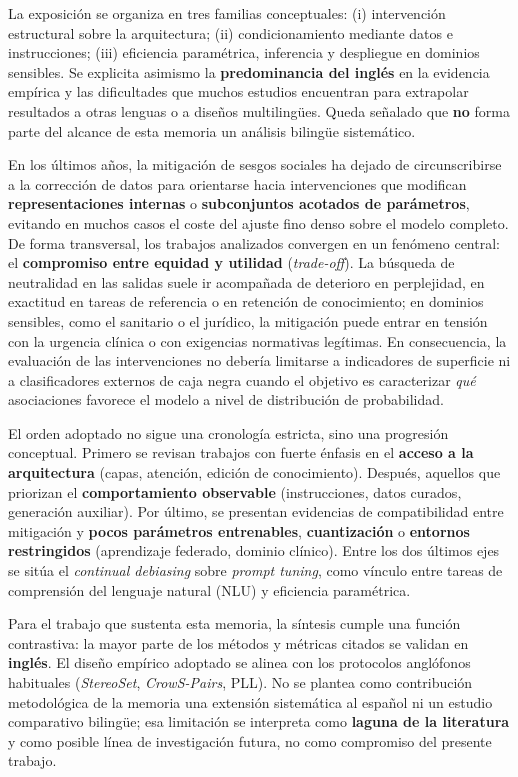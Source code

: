 \documentclass[12pt,a4paper]{report}
\begin{document}
La exposición se organiza en tres familias conceptuales: (i) intervención estructural sobre la arquitectura; (ii) condicionamiento mediante datos e instrucciones; (iii) eficiencia paramétrica, inferencia y despliegue en dominios sensibles. Se explicita asimismo la \textbf{predominancia del inglés} en la evidencia empírica y las dificultades que muchos estudios encuentran para extrapolar resultados a otras lenguas o a diseños multilingües. Queda señalado que \textbf{no} forma parte del alcance de esta memoria un análisis bilingüe sistemático.

En los últimos años, la mitigación de sesgos sociales ha dejado de circunscribirse a la corrección de datos para orientarse hacia intervenciones que modifican \textbf{representaciones internas} o \textbf{subconjuntos acotados de parámetros}, evitando en muchos casos el coste del ajuste fino denso sobre el modelo completo. De forma transversal, los trabajos analizados convergen en un fenómeno central: el \textbf{compromiso entre equidad y utilidad} (\textit{trade-off}). La búsqueda de neutralidad en las salidas suele ir acompañada de deterioro en perplejidad, en exactitud en tareas de referencia o en retención de conocimiento; en dominios sensibles, como el sanitario o el jurídico, la mitigación puede entrar en tensión con la urgencia clínica o con exigencias normativas legítimas. En consecuencia, la evaluación de las intervenciones no debería limitarse a indicadores de superficie ni a clasificadores externos de caja negra cuando el objetivo es caracterizar \emph{qué} asociaciones favorece el modelo a nivel de distribución de probabilidad.

El orden adoptado no sigue una cronología estricta, sino una progresión conceptual. Primero se revisan trabajos con fuerte énfasis en el \textbf{acceso a la arquitectura} (capas, atención, edición de conocimiento). Después, aquellos que priorizan el \textbf{comportamiento observable} (instrucciones, datos curados, generación auxiliar). Por último, se presentan evidencias de compatibilidad entre mitigación y \textbf{pocos parámetros entrenables}, \textbf{cuantización} o \textbf{entornos restringidos} (aprendizaje federado, dominio clínico). Entre los dos últimos ejes se sitúa el \textit{continual debiasing} sobre \textit{prompt tuning}, como vínculo entre tareas de comprensión del lenguaje natural (NLU) y eficiencia paramétrica.

Para el trabajo que sustenta esta memoria, la síntesis cumple una función contrastiva: la mayor parte de los métodos y métricas citados se validan en \textbf{inglés}. El diseño empírico adoptado se alinea con los protocolos anglófonos habituales (\textit{StereoSet}, \textit{CrowS-Pairs}, PLL). No se plantea como contribución metodológica de la memoria una extensión sistemática al español ni un estudio comparativo bilingüe; esa limitación se interpreta como \textbf{laguna de la literatura} y como posible línea de investigación futura, no como compromiso del presente trabajo.
\end{document}
